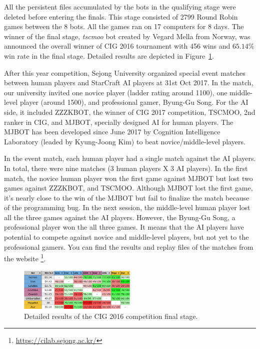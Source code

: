 All the persistent files accumulated by the bots in the qualifying stage were deleted before entering the finals. This stage consisted of 2799 Round Robin games between the 8 bots. All the games ran on 17 computers for 8 days. The winner of the final stage, {\em tscmoo} bot created by Vegard Mella from Norway, was announced the overall winner of CIG 2016 tournament with 456 wins and $65.14\%$ win rate in the final stage. Detailed results are depicted in Figure~\ref{figCIGresults}. 

After this year competition, Sejong University organized special event matches between human players and StarCraft AI players at 31st Oct 2017. In the match, our university invited one novice player (ladder rating around 1100), one middle-level player (around 1500), and professional gamer, Byung-Gu Song. For the AI side, it included ZZZKBOT, the winner of CIG 2017 competition, TSCMOO, 2nd ranker in CIG, and MJBOT, specially designed AI for human players. The MJBOT has been developed since June 2017 by Cognition Intelligence Laboratory (leaded by Kyung-Joong Kim) to beat novice/middle-level players. 

In the event match, each human player had a single match against the AI players. In total, there were nine matches (3 human players X 3 AI players). In the first match, the novice human player won the first game against MJBOT but lost two games against ZZZKBOT, and TSCMOO. Although MJBOT lost the first game, it's nearly close to the win of the MJBOT but fail to finalize the match because of the programming bug. In the next session, the middle-level human player lost all the three games against the AI players. However, the Byung-Gu Song, a professional player won the all three games. It means that the AI players have potential to compete against novice and middle-level players, but not yet to the professional gamers. You can find the results and replay files of the matches from the website \footnote{\url{https://cilab.sejong.ac.kr/}}. 


\begin{figure}[h]
  \centering
  \includegraphics[width=0.5\textwidth]{fig/cig-results.png}
  \caption{Detailed results of the CIG 2016 competition final stage.}
  \label{figCIGresults}
\end{figure}

